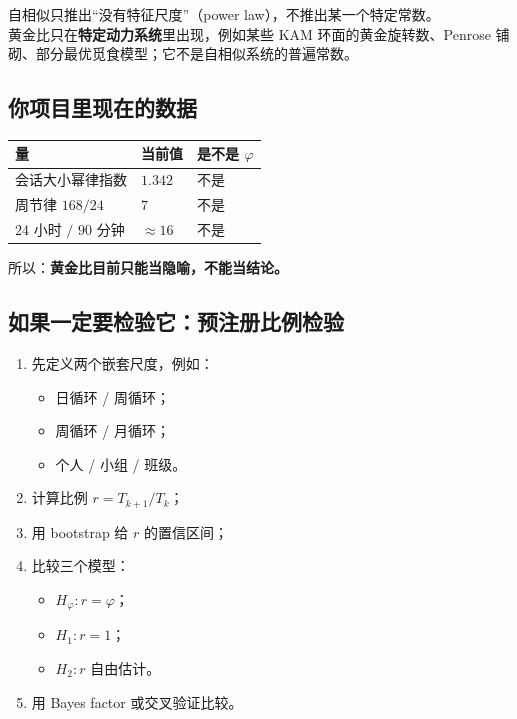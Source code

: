 \documentclass[UTF8,a4paper,11pt]{ctexart}
\begin{document}
自相似只推出“没有特征尺度”（power law），不推出某一个特定常数。\\
黄金比只在\textbf{特定动力系统}里出现，例如某些 KAM 环面的黄金旋转数、Penrose 铺砌、部分最优觅食模型；它不是自相似系统的普遍常数。

\subsection{你项目里现在的数据}

\begin{center}
\begin{longtable}{@{}p{6.0cm}p{4.5cm}p{3.0cm}@{}}
\toprule
\textbf{量} & \textbf{当前值} & \textbf{是不是 $\varphi$} \\
\midrule
会话大小幂律指数 & $1.342$ & 不是 \\
周节律 $168/24$ & $7$ & 不是 \\
$24$ 小时 $/$ $90$ 分钟 & $\approx16$ & 不是 \\
\bottomrule
\end{longtable}
\end{center}

所以：\textbf{黄金比目前只能当隐喻，不能当结论。}

\subsection{如果一定要检验它：预注册比例检验}

\begin{enumerate}[leftmargin=2em]
\item 先定义两个嵌套尺度，例如：
  \begin{itemize}
  \item 日循环 / 周循环；
  \item 周循环 / 月循环；
  \item 个人 / 小组 / 班级。
  \end{itemize}
\item 计算比例 $r=T_{k+1}/T_k$；
\item 用 bootstrap 给 $r$ 的置信区间；
\item 比较三个模型：
  \begin{itemize}
  \item $H_\varphi: r=\varphi$；
  \item $H_1: r=1$；
  \item $H_2: r$ 自由估计。
  \end{itemize}
\item 用 Bayes factor 或交叉验证比较。
\end{enumerate}
\end{document}
